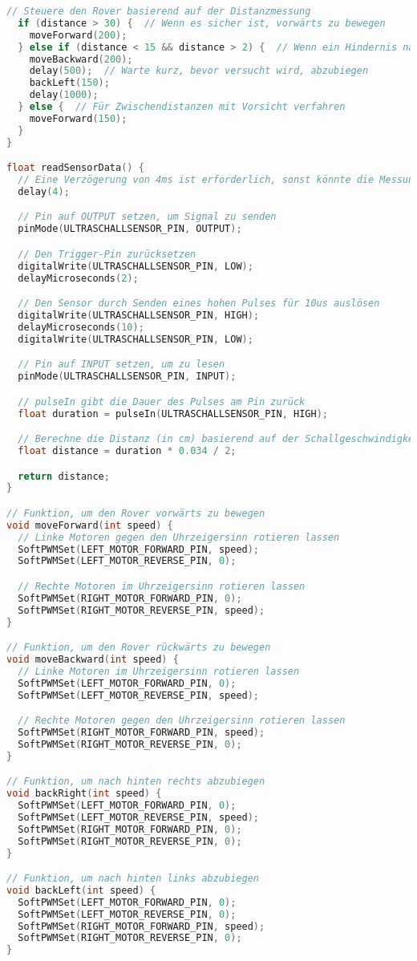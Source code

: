 \documentclass{vorlage-design-main}
\begin{document}
\begin{lstlisting}[language={C++}]
  // Steuere den Rover basierend auf der Distanzmessung
  if (distance > 30) {  // Wenn es sicher ist, vorwärts zu bewegen
    moveForward(200);
  } else if (distance < 15 && distance > 2) {  // Wenn ein Hindernis nahe ist
    moveBackward(200);
    delay(500);  // Warte kurz, bevor versucht wird, abzubiegen
    backLeft(150);
    delay(1000);
  } else {  // Für Zwischendistanzen mit Vorsicht verfahren
    moveForward(150);
  }
}

float readSensorData() {
  // Eine Verzögerung von 4ms ist erforderlich, sonst könnte die Messung 0 sein
  delay(4);

  // Pin auf OUTPUT setzen, um Signal zu senden
  pinMode(ULTRASCHALLSENSOR_PIN, OUTPUT);

  // Den Trigger-Pin zurücksetzen
  digitalWrite(ULTRASCHALLSENSOR_PIN, LOW);
  delayMicroseconds(2);

  // Den Sensor durch Senden eines hohen Pulses für 10us auslösen
  digitalWrite(ULTRASCHALLSENSOR_PIN, HIGH);
  delayMicroseconds(10);
  digitalWrite(ULTRASCHALLSENSOR_PIN, LOW);

  // Pin auf INPUT setzen, um zu lesen
  pinMode(ULTRASCHALLSENSOR_PIN, INPUT);

  // pulseIn gibt die Dauer des Pulses am Pin zurück
  float duration = pulseIn(ULTRASCHALLSENSOR_PIN, HIGH);

  // Berechne die Distanz (in cm) basierend auf der Schallgeschwindigkeit (340 m/s oder 0.034 cm/us)
  float distance = duration * 0.034 / 2;

  return distance;
}

// Funktion, um den Rover vorwärts zu bewegen
void moveForward(int speed) {
  // Linke Motoren gegen den Uhrzeigersinn rotieren lassen
  SoftPWMSet(LEFT_MOTOR_FORWARD_PIN, speed);
  SoftPWMSet(LEFT_MOTOR_REVERSE_PIN, 0);

  // Rechte Motoren im Uhrzeigersinn rotieren lassen
  SoftPWMSet(RIGHT_MOTOR_FORWARD_PIN, 0);
  SoftPWMSet(RIGHT_MOTOR_REVERSE_PIN, speed);
}

// Funktion, um den Rover rückwärts zu bewegen
void moveBackward(int speed) {
  // Linke Motoren im Uhrzeigersinn rotieren lassen
  SoftPWMSet(LEFT_MOTOR_FORWARD_PIN, 0);
  SoftPWMSet(LEFT_MOTOR_REVERSE_PIN, speed);

  // Rechte Motoren gegen den Uhrzeigersinn rotieren lassen
  SoftPWMSet(RIGHT_MOTOR_FORWARD_PIN, speed);
  SoftPWMSet(RIGHT_MOTOR_REVERSE_PIN, 0);
}

// Funktion, um nach hinten rechts abzubiegen
void backRight(int speed) {
  SoftPWMSet(LEFT_MOTOR_FORWARD_PIN, 0);
  SoftPWMSet(LEFT_MOTOR_REVERSE_PIN, speed);
  SoftPWMSet(RIGHT_MOTOR_FORWARD_PIN, 0);
  SoftPWMSet(RIGHT_MOTOR_REVERSE_PIN, 0);
}

// Funktion, um nach hinten links abzubiegen
void backLeft(int speed) {
  SoftPWMSet(LEFT_MOTOR_FORWARD_PIN, 0);
  SoftPWMSet(LEFT_MOTOR_REVERSE_PIN, 0);
  SoftPWMSet(RIGHT_MOTOR_FORWARD_PIN, speed);
  SoftPWMSet(RIGHT_MOTOR_REVERSE_PIN, 0);
}
\end{lstlisting}
\end{document}
